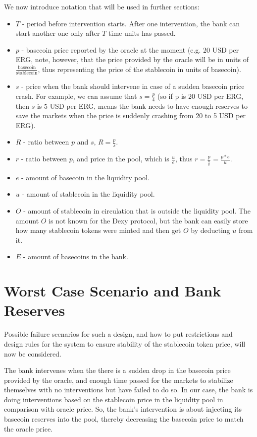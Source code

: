 \documentclass[a4paper,UKenglish,cleveref, autoref, thm-restate]{lipics-v2021}
\newcommand{\stc}{stablecoin}
\newcommand{\sct}{stablecoin}
\newcommand{\dx}{Dexy}
\begin{document}
We now introduce notation that will be used in further sections:
\begin{itemize}
  \item{} $T$ - period before intervention starts. After one intervention, the bank can start another one only after $T$ time units has passed. 
  \item{} $p$ - basecoin price reported by the oracle at the moment (e.g. 20 USD per ERG, note, however, that the price provided by the oracle will be in units of $\frac{\mathrm{basecoin}}{\mathrm{stablecoin}}$, thus representing the price of the stablecoin in units of basecoin).
  \item{} $s$ - price when the bank should intervene in case of a sudden basecoin price crash. For example, we can assume that $s = \frac{p}{4}$ (so if p is 20 USD per ERG, then $s$ is 5 USD per ERG, means the bank needs to have enough reserves to save the markets when the price is suddenly crashing from 20 to 5 USD per ERG).
  \item{} $R$ - ratio between $p$ and $s$, $R = \frac{p}{s}$.
  \item{} $r$ - ratio between $p$, and price in the pool, which is $\frac{u}{e}$, thus $r = \frac{p}{\frac{u}{e}} = \frac{p*e}{u}$.
  \item{} $e$ - amount of basecoin in the liquidity pool. 
  \item{} $u$ - amount of \stc{} in the liquidity pool.
  \item{} $O$ - amount of \stc{} in circulation that is outside the liquidity pool. The amount $O$ is not known for the \dx{} protocol, but the bank can easily store how many \sct{} tokens were minted and then get $O$ by deducting $u$ from it.
  \item{} $E$ - amount of basecoins in the bank. 
\end{itemize}  

\section{Worst Case Scenario and Bank Reserves}
\label{sec:worst-case}

Possible failure scenarios for such a design, and how to put restrictions and design rules for the system to ensure stability of the \sct{} token price, will now be considered. 

The bank intervenes when the there is a sudden drop in the basecoin price provided by the oracle, and enough time passed for the markets to stabilize themselves with no interventions but have failed to do so. In our case, the bank is doing interventions based on the stablecoin price in the liquidity pool in comparison with oracle price. So, the bank's intervention is about injecting its basecoin reserves into the pool, thereby decreasing the basecoin price to match the oracle price.  
\end{document}

